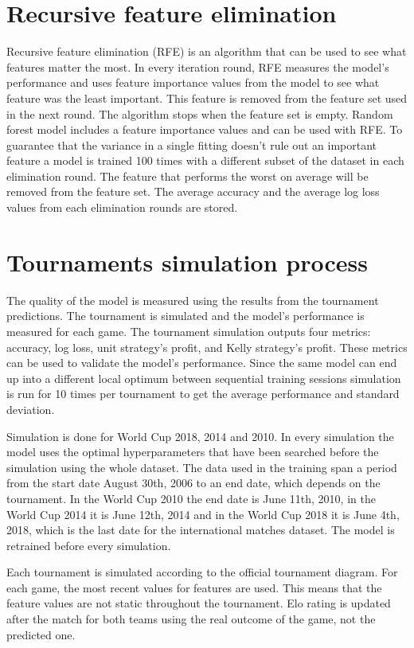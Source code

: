 \section{Recursive feature elimination}
Recursive feature elimination (RFE) is an algorithm that can be used to see what features matter the most. In every iteration round, RFE measures the model's performance and uses feature importance values from the model to see what feature was the least important. This feature is removed from the feature set used in the next round. The algorithm stops when the feature set is empty. \cite{granitto2006recursive} Random forest model includes a feature importance values and can be used with RFE. To guarantee that the variance in a single fitting doesn't rule out an important feature a model is trained 100 times with a different subset of the dataset in each elimination round. The feature that performs the worst on average will be removed from the feature set. The average accuracy and the average log loss values from each elimination rounds are stored.

\section{Tournaments simulation process}
The quality of the model is measured using the results from the tournament predictions. The tournament is simulated and the model's performance is measured for each game. The tournament simulation outputs four metrics: accuracy, log loss, unit strategy's profit, and Kelly strategy's profit. These metrics can be used to validate the model's performance. Since the same model can end up into a different local optimum between sequential training sessions simulation is run for 10 times per tournament to get the average performance and standard deviation.

Simulation is done for World Cup 2018, 2014 and 2010. In every simulation the model uses the optimal hyperparameters that have been searched before the simulation using the whole dataset. The data used in the training span a period from the start date August 30th, 2006 to an end date, which depends on the tournament. In the World Cup 2010 the end date is June 11th, 2010, in the World Cup 2014 it is June 12th, 2014 and in the World Cup 2018 it is June 4th, 2018, which is the last date for the international matches dataset. The model is retrained before every simulation.

Each tournament is simulated according to the official tournament diagram. For each game, the most recent values for features are used. This means that the feature values are not static throughout the tournament. Elo rating is updated after the match for both teams using the real outcome of the game, not the predicted one.

